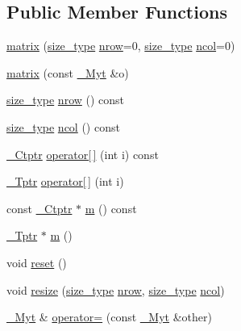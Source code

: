 \subsection*{Public Member Functions}
\begin{DoxyCompactItemize}
\item 
\hyperlink{classupc_1_1matrix_a908e2ae559167d0376d2b095116029ab}{matrix} (\hyperlink{classupc_1_1matrix_a0f2b47f0fc08216f8e0ef1cc1c022663}{size\+\_\+type} \hyperlink{classupc_1_1matrix_a7b922be25c0cf0d255252a4fe7350ea2}{nrow}=0, \hyperlink{classupc_1_1matrix_a0f2b47f0fc08216f8e0ef1cc1c022663}{size\+\_\+type} \hyperlink{classupc_1_1matrix_a0e8f41d88948610215db9cc8eafa02a6}{ncol}=0)
\item 
\hyperlink{classupc_1_1matrix_aedb3ba241346dfac0655cf4b63715e7f}{matrix} (const \hyperlink{classupc_1_1matrix_a9e671131fc3af250bb4bad539474da9c}{\+\_\+\+Myt} \&o)
\item 
\hyperlink{classupc_1_1matrix_a0f2b47f0fc08216f8e0ef1cc1c022663}{size\+\_\+type} \hyperlink{classupc_1_1matrix_a7b922be25c0cf0d255252a4fe7350ea2}{nrow} () const 
\item 
\hyperlink{classupc_1_1matrix_a0f2b47f0fc08216f8e0ef1cc1c022663}{size\+\_\+type} \hyperlink{classupc_1_1matrix_a0e8f41d88948610215db9cc8eafa02a6}{ncol} () const 
\item 
\hyperlink{classupc_1_1matrix_af4880980335adaf4abe61988558472f5}{\+\_\+\+Ctptr} \hyperlink{classupc_1_1matrix_a773213642b2ba0beda6e19618e2b949a}{operator\mbox{[}$\,$\mbox{]}} (int i) const 
\item 
\hyperlink{classupc_1_1matrix_a75a85786a5de55cdfcdf1f205df1f3e8}{\+\_\+\+Tptr} \hyperlink{classupc_1_1matrix_a1016950fd091e3798fa475b5f2e90719}{operator\mbox{[}$\,$\mbox{]}} (int i)
\item 
const \hyperlink{classupc_1_1matrix_af4880980335adaf4abe61988558472f5}{\+\_\+\+Ctptr} $\ast$ \hyperlink{classupc_1_1matrix_add034dcb2c5abd3d6a728da60f5590e9}{m} () const 
\item 
\hyperlink{classupc_1_1matrix_a75a85786a5de55cdfcdf1f205df1f3e8}{\+\_\+\+Tptr} $\ast$ \hyperlink{classupc_1_1matrix_a6b505e71e56088332a4203f6b6032dcf}{m} ()
\item 
void \hyperlink{classupc_1_1matrix_aec394dcccbfaad5c75a013874814c475}{reset} ()
\item 
void \hyperlink{classupc_1_1matrix_ad9c957658ec403494af0d92fa2c499fb}{resize} (\hyperlink{classupc_1_1matrix_a0f2b47f0fc08216f8e0ef1cc1c022663}{size\+\_\+type} \hyperlink{classupc_1_1matrix_a7b922be25c0cf0d255252a4fe7350ea2}{nrow}, \hyperlink{classupc_1_1matrix_a0f2b47f0fc08216f8e0ef1cc1c022663}{size\+\_\+type} \hyperlink{classupc_1_1matrix_a0e8f41d88948610215db9cc8eafa02a6}{ncol})
\item 
\hyperlink{classupc_1_1matrix_a9e671131fc3af250bb4bad539474da9c}{\+\_\+\+Myt} \& \hyperlink{classupc_1_1matrix_a9a0d300fcfe6652fde1347c139291919}{operator=} (const \hyperlink{classupc_1_1matrix_a9e671131fc3af250bb4bad539474da9c}{\+\_\+\+Myt} \&other)
\end{DoxyCompactItemize}
